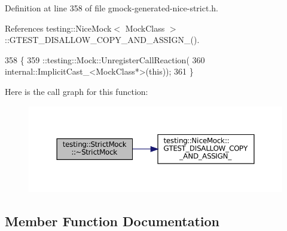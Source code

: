 Definition at line 358 of file gmock-\/generated-\/nice-\/strict.\+h.



References testing\+::\+Nice\+Mock$<$ Mock\+Class $>$\+::\+G\+T\+E\+S\+T\+\_\+\+D\+I\+S\+A\+L\+L\+O\+W\+\_\+\+C\+O\+P\+Y\+\_\+\+A\+N\+D\+\_\+\+A\+S\+S\+I\+G\+N\+\_\+().


\begin{DoxyCode}
358                         \{
359     ::testing::Mock::UnregisterCallReaction(
360         internal::ImplicitCast\_<MockClass*>(\textcolor{keyword}{this}));
361   \}
\end{DoxyCode}
Here is the call graph for this function\+:
\nopagebreak
\begin{figure}[H]
\begin{center}
\leavevmode
\includegraphics[width=350pt]{classtesting_1_1StrictMock_ae22ba62955775b26c88937ee225db528_cgraph}
\end{center}
\end{figure}


\subsection{Member Function Documentation}
\mbox{\label{classtesting_1_1StrictMock_af8425a436acea9e665a223971bac8a71}} 
